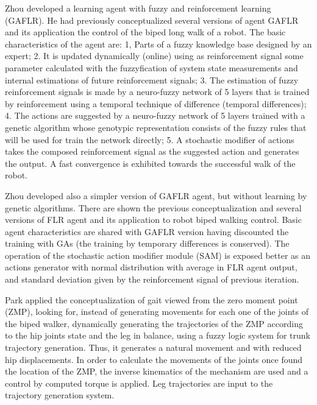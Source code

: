 Zhou \cite{Zhou02Robot} developed a learning agent with fuzzy and reinforcement learning (GAFLR). He had previously conceptualized several versions of agent GAFLR and its application the control of the biped long walk of a robot. The basic characteristics of the agent are: 1, Parts of a fuzzy knowledge base designed by an expert; 2. It is updated dynamically (online) using as reinforcement signal some parameter calculated with the fuzzyfication of system state measurements and internal estimations of future reinforcement signals; 3. The estimation of fuzzy reinforcement signals is made by a neuro-fuzzy network  of 5 layers that is trained by reinforcement using a temporal technique of difference (temporal differences); 4. The actions are suggested by a neuro-fuzzy network of 5 layers trained with a genetic algorithm whose genotypic representation consists of the fuzzy rules that will be used for train the network directly; 5. A stochastic modifier of actions takes the composed reinforcement signal as the suggested action and generates the output. A fast convergence is exhibited towards the successful walk of the robot.


Zhou \cite{Zhou03Dynamic} developed also a simpler version of GAFLR agent, but without learning by genetic algorithms. There are shown the previous conceptualization and several versions of FLR agent and its application to robot biped walking control. Basic agent characteristics are shared with GAFLR version having discounted the training with GAs (the training by temporary differences is conserved). The operation of the stochastic action modifier module (SAM) is exposed better as an actions generator with normal distribution with average in FLR agent output, and standard deviation given by the reinforcement signal of previous iteration. 


Park \cite{Park03Fuzzy-logic} applied the conceptualization of gait viewed from the zero moment point (ZMP), looking for, instead of generating movements for each one of the joints of the biped walker, dynamically generating the trajectories of the ZMP according to the hip joints state and the leg in balance, using a fuzzy logic system for trunk trajectory generation. Thus, it generates a natural movement and with reduced hip displacements. In order to calculate the movements of the joints once found the location of the ZMP, the inverse kinematics of the mechanism are used and a control by computed torque is applied. Leg trajectories are input to the trajectory generation system.


